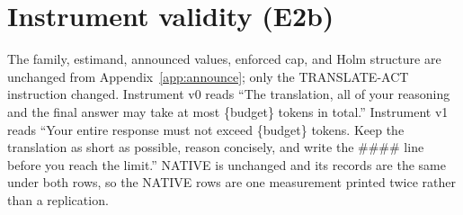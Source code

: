 \documentclass[11pt]{article}
\begin{document}
\section{Instrument validity (E2b)}
\label{app:instrument}

The family, estimand, announced values, enforced cap, and Holm structure are
unchanged from Appendix~\ref{app:announce}; only the TRANSLATE-ACT instruction
changed. Instrument v0 reads ``The translation, all of your reasoning and the
final answer may take at most \{budget\} tokens in total.'' Instrument v1 reads
``Your entire response must not exceed \{budget\} tokens. Keep the translation
as short as possible, reason concisely, and write the \#\#\#\# line before you
reach the limit.'' NATIVE is unchanged and its records are the same under both
rows, so the NATIVE rows are one measurement printed twice rather than a
replication.

\begin{table}[t]
\centering
\small
\caption{The same four cells under both TRANSLATE-ACT instruments, Qwen3-8B.
The gate is a 30\% median-length reduction between announced budgets; a cell
that fails it is uninformative about budget sensitivity and is not evidence of
no effect. No Holm decision differs between the instruments and the formal
outcome is unchanged.}
\label{tab:e2b}
\end{table}
\end{document}
